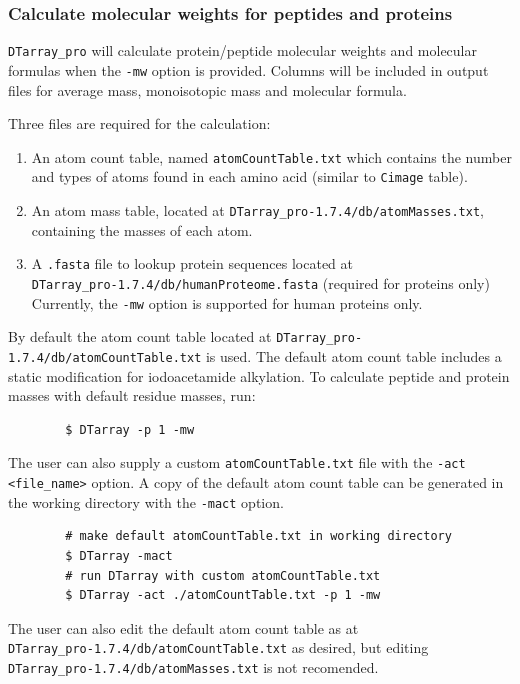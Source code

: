 \documentclass[12pt]{article}
\newcommand{\VERSION}{1.7.4}
\begin{document}
	\subsubsection{Calculate molecular weights for peptides and proteins}
	
	\texttt{DTarray\_pro} will calculate protein/peptide molecular weights and  molecular  formulas when the \texttt{-mw} option is provided. Columns  will  be  included in output files for average mass, monoisotopic mass and molecular formula.  
	
	\bigskip
	\noindent
	Three files are required for the calculation:
	
	\begin{enumerate}
		\item  An atom count table, named \texttt{atomCountTable.txt} which contains the number and types of atoms found in each amino acid (similar to \texttt{Cimage} table).
		
		\item An atom mass table, located at \texttt{DTarray\_pro-\VERSION/db/atomMasses.txt}, containing the masses of each atom.  
		
		\item A \texttt{.fasta} file to lookup protein sequences located at \\ \texttt{DTarray\_pro-\VERSION/db/humanProteome.fasta} (required for proteins only) Currently, the \texttt{-mw} option is supported for human proteins only.
	\end{enumerate}
	
	\noindent
	By default the atom count table located at \texttt{DTarray\_pro-\VERSION/db/atomCountTable.txt} is used. The default atom count table includes a static modification for iodoacetamide alkylation.  To calculate peptide and protein masses with default residue masses, run:
	
	\begin{lstlisting}
		$ DTarray -p 1 -mw
	\end{lstlisting}
	
	The  user  can  also supply a custom \texttt{atomCountTable.txt} file with the \texttt{-act <file\_name>} option. A copy of the default atom count table can be generated in the working directory with the \texttt{-mact} option.  
	
	\begin{lstlisting}
		# make default atomCountTable.txt in working directory
		$ DTarray -mact
		# run DTarray with custom atomCountTable.txt
		$ DTarray -act ./atomCountTable.txt -p 1 -mw
	\end{lstlisting}
	
	\noindent
	The user can also edit the default atom count table as at \\ \texttt{DTarray\_pro-\VERSION/db/atomCountTable.txt} as desired, but editing \\ \texttt{DTarray\_pro-\VERSION/db/atomMasses.txt} is not recomended.
	
\end{document}
